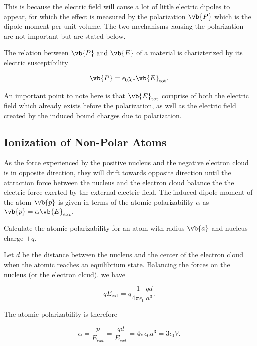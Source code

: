 \documentclass[english,a4paper,12pt]{report}
\begin{document}
This is because the electric field will cause a lot of little electric dipoles to appear, for which the effect is measured by the polarization \(\vb{P} \) which is the dipole moment per unit volume. The two mechanisms causing the polarization are not important but are stated below.

The relation between \(\vb{P} \text { and } \vb{E} \) of a material is charizterized by its electric susceptibility 

\begin{equation}
    \vb{P} = \epsilon _{0} \chi _{e}\vb{E}_{\text{tot} }.
\end{equation}

An important point to note here is that \(\vb{E} _{\text{tot} } \) comprise of both the electric field which already exists before the polarization, as well as the electric field created by the induced bound charges due to polarization. 

\subsection{Ionization of Non-Polar Atoms}

As the force experienced by the positive nucleus and the negative electron cloud is in opposite direction, they will drift towards opposite direction until the attraction force between the nucleus and the electron cloud balance the the electric force exerted by the external electric field. The induced dipole moment of the atom \(\vb{p} \) is given in terms of the atomic polarizability \(\alpha \) as \(\vb{p} = \alpha \vb{E}_{ext}  \).

{Calculate the atomic polarizability for an atom with radius \(\vb{a} \) and nucleus charge \(+q\).}
{Let \(d\) be the distance between the nucleus and the center of the electron cloud when the atomic reaches an equilibrium state. Balancing the forces on the nucleus (or the electron cloud), we have

\begin{equation}
    qE_{\text{ext} }  = q \frac{1}{4\pi \epsilon_0} \frac{qd}{a^3 }.
\end{equation}

The atomic polarizability is therefore 

\begin{equation}
    \alpha = \frac{p}{E_{ext} } =  \frac{qd}{E_{ext} } = 4\pi \epsilon _0 a^3 = 3\epsilon _0 V. 
\end{equation}
} 
\end{document}
